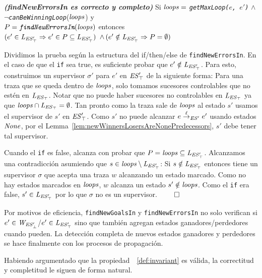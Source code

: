 \begin{lemma}\textbf{\emph{(findNewErrorsIn es correcto y completo)}}
\label{lem:findErrorsWorks}
Si $\mathit{loops} =$ \emph{\texttt{getMaxLoop($e$, $e'$)}} $\wedge$\\ 
$\neg$\emph{\texttt{canBeWinningLoop}}($\mathit{loops}$) y \\
$P=\emph{\texttt{findNewErrorsIn}}(\mathit{loops})$ entonces \\
$(e' \in \mathit{L_{\mathit{\mathit{ES}'_{\top}}}} \Rightarrow e' \in P 
\subseteq \mathit{L_{\mathit{\mathit{ES}'_{\top}}}})$ $\wedge \, (e' \notin \mathit{L_{\mathit{\mathit{ES}'_{\top}}}} \Rightarrow P = 
\emptyset)$
\end{lemma}

\begin{Proof Sketch}
Dividimos la prueba según la estructura del  if/then/else de \texttt{findNewErrorsIn}. 
En el caso de que el \texttt{if} sea true, es suficiente probar que $e' \notin \mathit{L_{\mathit{\mathit{ES}'_{\top}}}}$. Para esto, 
construimos un supervisor $\sigma'$ para $e'$ en $\mathit{\mathit{ES}'_{\top}}$ de la siguiente forma: Para una traza que se queda dentro de $\mathit{loops}$, solo tomamos sucesores controlables que no estén en $\mathit{L_{\mathit{\mathit{ES}_{\top}}}}$. Notar que no puede haber sucesores no controlables en $\mathit{L_{\mathit{\mathit{ES}_{\top}}}}$ ya que
$\mathit{loops} \cap \mathit{L_{\mathit{\mathit{ES}_{\top}}}}= \emptyset$. Tan pronto como la traza sale de $\mathit{loops}$ al estado $s'$ usamos el supervisor de $s'$ en $\mathit{\mathit{ES}'_{\top}}$. 
Como $s'$ no puede alcanzar $e \overset{\ell}{\rightarrow}_{\mathit{ES}'} 
e'$ usando estados $\mathit{None}$, por el 
Lemma~\ref{lem:newWinnersLosersAreNonePredecessors}, $s'$ debe tener tal supervisor. 

Cuando el \texttt{if} es false, alcanza con probar que $P = \mathit{loops} \subseteq \mathit{L_{\mathit{\mathit{ES}'_{\top}}}}$. Alcanzamos una contradicción asumiendo que $s \in \mathit{loops} \setminus \mathit{L_{\mathit{\mathit{ES}'_{\top}}}}$: Si $s 
\notin \mathit{L_{\mathit{\mathit{ES}'_{\top}}}}$ entonces tiene un supervisor $\sigma$ que acepta una traza $w$ alcanzando un estado marcado. Como no hay estados marcados en $\mathit{loops}$, $w$ alcanza un estado $s' \notin \mathit{loops}$. Como el
\texttt{if} era false, $s' \in \mathit{L_{\mathit{\mathit{ES}'_{\top}}}}$ por lo que $\sigma$ no es un supervisor.
\hfill$\qed$
\end{Proof Sketch}

Por motivos de eficiencia, \texttt{findNewGoalsIn} y
\texttt{findNewErrorsIn} no solo verifican si $e' \in \mathit{W_{\mathit{\mathit{ES}'_{\bot}}}}$/$e' \in 
\mathit{L_{\mathit{\mathit{ES}'_{\top}}}}$ sino que también agregan estados ganadores/perdedores cuando pueden. La detección completa de nuevos estados ganadores y perdedores se hace finalmente con los procesos de propagación. 

Habiendo argumentado que la propiedad~~\ref{def:invariant} es válida, la correctitud y completitud le siguen de forma natural. 

